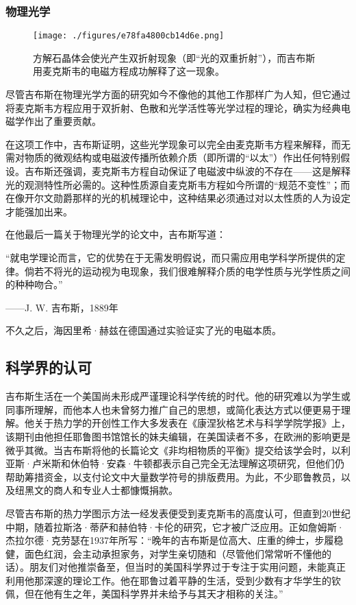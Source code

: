 \subsubsection{物理光学}
\begin{figure}[ht]
\centering
\texttt{[image: ./figures/e78fa4800cb14d6e.png]}
\caption{方解石晶体会使光产生双折射现象（即“光的双重折射”），而吉布斯用麦克斯韦的电磁方程成功解释了这一现象。} \label{fig_QSY_9}
\end{figure}
尽管吉布斯在物理光学方面的研究如今不像他的其他工作那样广为人知，但它通过将麦克斯韦方程应用于双折射、色散和光学活性等光学过程的理论，确实为经典电磁学作出了重要贡献。

在这项工作中，吉布斯证明，这些光学现象可以完全由麦克斯韦方程来解释，而无需对物质的微观结构或电磁波传播所依赖介质（即所谓的“以太”）作出任何特别假设。吉布斯还强调，麦克斯韦方程自动保证了电磁波中纵波的不存在——这是解释光的观测特性所必需的。这种性质源自麦克斯韦方程如今所谓的“规范不变性”；而在像开尔文勋爵那样的光的机械理论中，这种结果必须通过对以太性质的人为设定才能强加出来。

在他最后一篇关于物理光学的论文中，吉布斯写道：

“就电学理论而言，它的优势在于无需发明假说，而只需应用电学科学所提供的定律。倘若不将光的运动视为电现象，我们很难解释介质的电学性质与光学性质之间的种种吻合。”

——J. W. 吉布斯，1889年

不久之后，海因里希·赫兹在德国通过实验证实了光的电磁本质。
\subsection{科学界的认可}
吉布斯生活在一个美国尚未形成严谨理论科学传统的时代。他的研究难以为学生或同事所理解，而他本人也未曾努力推广自己的思想，或简化表达方式以便更易于理解。他关于热力学的开创性工作大多发表在《康涅狄格艺术与科学学院学报》上，该期刊由他担任耶鲁图书馆馆长的妹夫编辑，在美国读者不多，在欧洲的影响更是微乎其微。当吉布斯将他的长篇论文《非均相物质的平衡》提交给该学会时，以利亚斯·卢米斯和休伯特·安森·牛顿都表示自己完全无法理解这项研究，但他们仍帮助筹措资金，以支付论文中大量数学符号的排版费用。为此，不少耶鲁教员，以及纽黑文的商人和专业人士都慷慨捐款。

尽管吉布斯的热力学图示方法一经发表便受到麦克斯韦的高度认可，但直到20世纪中期，随着拉斯洛·蒂萨和赫伯特·卡伦的研究，它才被广泛应用。正如詹姆斯·杰拉尔德·克劳瑟在1937年所写：“晚年的吉布斯是位高大、庄重的绅士，步履稳健，面色红润，会主动承担家务，对学生亲切随和（尽管他们常常听不懂他的话）。朋友们对他推崇备至，但当时的美国科学界过于专注于实用问题，未能真正利用他那深邃的理论工作。他在耶鲁过着平静的生活，受到少数有才华学生的钦佩，但在他有生之年，美国科学界并未给予与其天才相称的关注。”

